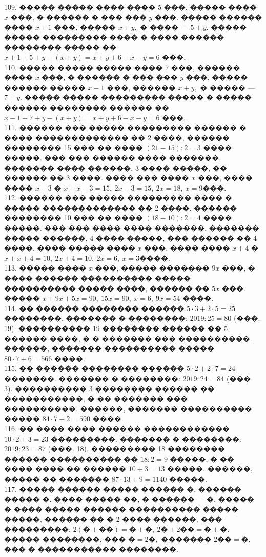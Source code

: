 \documentclass[12pt]{article}
\begin{document}
109. ����� ����� ���� ���� 5 ���, ����� ���� $x$ ���, � ������ � ��� ��� $y$ ���. ����� ������ ���� $x+1$ ���, ����� $x+y,$ � ���� --- $5+y.$ ����� ����� ��������� ���� � ���� ������ �������� ����� �� $x+1+5+y-(x+y)=x+y+6-x-y=6$ ���.\\
110. ����� ����� ����� ���� 7 ���, ������ ���� $x$ ���, � ������ � ��� ��� $y$ ���. ����� ������ ����� $x-1$ ���, ������ $x+y,$ � ����� --- $7+y.$ ����� ����� ��������� ����� � ����� ������ �������� ������ �� $x-1+7+y-(x+y)=x+y+6-x-y=6$ ���.\\
111. ������ ��� ����� ��������� ������ � ���� ������������� �� 2 ����, ������ �������� 15 ��� �� ���� $(21-15):2=3$ ���� �����. ��� ��� ������ ���� �������, ������� ���� ������, 3 ���� �����, �� ������ �� 3 ����. ���� ��� ���� $x$ ���, ���� ���� $x-3$ � $x+x-3=15,\ 2x-3=15,\ 2x=18,\ x=9$���.\\
112. ������ ��� ����� ��������� ���� � ����� ������������� �� 2 ����, ������ �������� 10 ��� �� ���� $(18-10):2=4$ ���� �����. ��� ��� ���� ���� �������, ������� ����� ������, 4 ���� �����, ��� ������ �� 4 ����. ���� ����� ���� $x$ ���, ���� ���� $x+4$ � $x+x+4=10,\ 2x+4=10,\ 2x=6,\ x=3$����.\\
113. ����� ���� $x$ ���, ����� ������� $9x$ ���, � ���� ������ ���������� ����� ���������� ����� ����, ������ �� $5x$ ���. ����� $x+9x+5x=90,\ 15x=90,\ x=6,\ 9x=54$ ����.\\
114. �� ������ �������� ������ $5\cdot3+2\cdot5=25$ ��������. ������� � ��������: $2019:25=80$ (���. 19). ���������� 19 �������� ������ �� 5 ������ ����, � � ������� ��� ����������. ������, ������� ���������� ����� $80\cdot7+6=566$ ����.\\
115. �� ������ �������� ������ $5\cdot2+2\cdot7=24$ �������. ������� � ��������: $2019:24=84$ (���. 3). ���������� 3 �������� ������ �� �����������, � �� ������� ��� ����������. ������, ������� ���������� ����� $84\cdot7+2=590$ ����.\\
116. �� ���� ���� ������ ������������ $10\cdot2+3=23$ ���������. ������� � ��������: $2019:23=87$ (���. 18). ��������� 18 �������� ������ ���������� �� $18:2=9$ �����, � �� ���� ���� �� ������ $10+3=13$ �����. ������, ����� �� ������� $87\cdot13+9=1140$ �����.\\
117. ����� ������ ����� ������ �, ������ ����� �, ����-����� ��, � ������ --- �. ����� � ����-����� ������ ���������� ����� �����, ������ �� � 2 ���� ������, ��� ���������: $2(\text{�}+\text{��})=\text{�}+\text{�},\ 2\text{�}+2\text{��}=\text{�}+\text{�}.$ ����� ��������, ��� $\text{�}=2\text{�},$ ������� $2\text{��}=\text{�},$ ��� � ����������� ��������.\\
\end{document}
